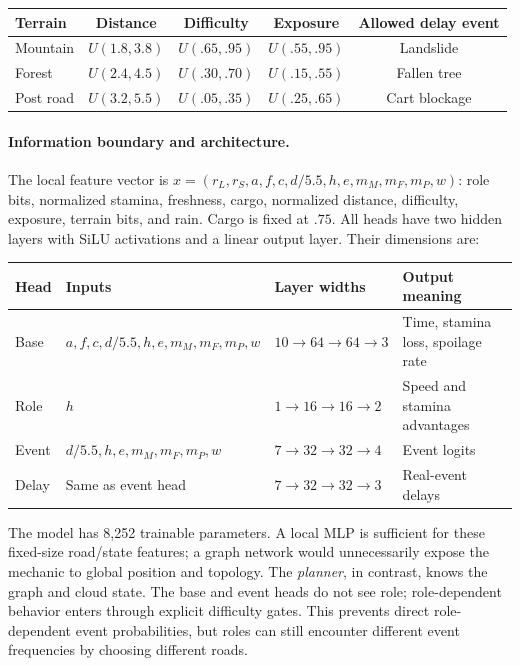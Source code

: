 \begin{center}
\begin{tabular}{lcccc}
\toprule
Terrain & Distance & Difficulty & Exposure & Allowed delay event\\
\midrule
Mountain & $U(1.8,3.8)$ & $U(.65,.95)$ & $U(.55,.95)$ & Landslide\\
Forest & $U(2.4,4.5)$ & $U(.30,.70)$ & $U(.15,.55)$ & Fallen tree\\
Post road & $U(3.2,5.5)$ & $U(.05,.35)$ & $U(.25,.65)$ & Cart blockage\\
\bottomrule
\end{tabular}
\end{center}

\paragraph{Information boundary and architecture.}
The local feature vector is
$x=(r_L,r_S,a,f,c,d/5.5,h,e,m_M,m_F,m_P,w)$: role bits, normalized stamina,
freshness, cargo, normalized distance, difficulty, exposure, terrain bits, and
rain. Cargo is fixed at $.75$. All heads have two hidden layers with SiLU
activations and a linear output layer. Their dimensions are:

\begin{center}
\begin{tabular}{llll}
\toprule
Head & Inputs & Layer widths & Output meaning\\
\midrule
Base & $a,f,c,d/5.5,h,e,m_M,m_F,m_P,w$ & $10\to64\to64\to3$ & Time, stamina loss, spoilage rate\\
Role & $h$ & $1\to16\to16\to2$ & Speed and stamina advantages\\
Event & $d/5.5,h,e,m_M,m_F,m_P,w$ & $7\to32\to32\to4$ & Event logits\\
Delay & Same as event head & $7\to32\to32\to3$ & Real-event delays\\
\bottomrule
\end{tabular}
\end{center}

The model has 8,252 trainable parameters. A local MLP is sufficient for these
fixed-size road/state features; a graph network would unnecessarily expose the
mechanic to global position and topology. The \emph{planner}, in contrast,
knows the graph and cloud state. The base and event heads do not see role;
role-dependent behavior enters through explicit difficulty gates. This prevents
direct role-dependent event probabilities, but roles can still encounter
different event frequencies by choosing different roads.


